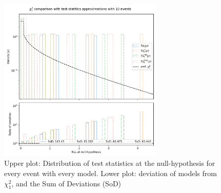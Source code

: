 \documentclass[14pt, a4paper]{article}  %
\begin{document}
\begin{figure}[!ht]
	\centering
        \includegraphics[width=0.7\textwidth]{Poisson_approx/NLL_densities.png}\caption{Upper plot: Distribution of test statistics at the null-hypothesis for every event with every model. Lower plot: deviation of models from $\chi^2_1$, and the Sum of Deviations (SoD) }\label{fig:example_chisqr_10}
\end{figure} 
\clearpage
\end{document}

